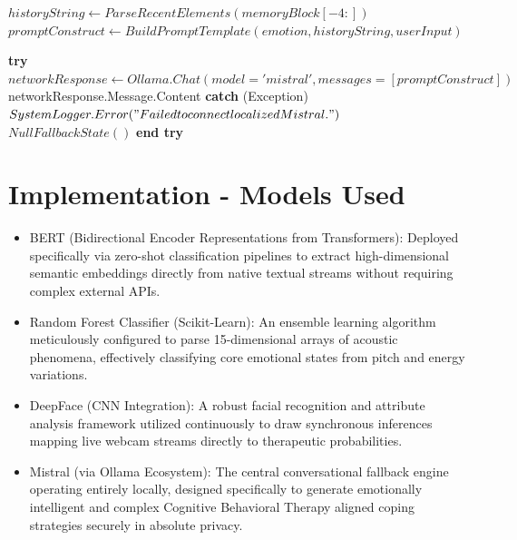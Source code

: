 \documentclass[11pt]{report}
\newcommand{\Try}{\State \textbf{try}}
\newcommand{\Catch}[1]{\State \textbf{catch} (#1)}
\newcommand{\EndTry}{\State \textbf{end try}}
\begin{document}
\begin{algorithm}[H]
\caption{Generate Complex Fallback Vectors Via Local LLM Contexts}
\label{alg:cbt_mistral}
\begin{algorithmic}[1]
    \State $historyString \gets ParseRecentElements(memoryBlock[-4:])$
    \State $promptConstruct \gets BuildPromptTemplate(emotion, historyString, userInput)$
    
    \Try
        \State $networkResponse \gets Ollama.Chat(model='mistral', messages=[promptConstruct])$
        \State \Return networkResponse.Message.Content
    \Catch{Exception}
        \State $SystemLogger.Error("Failed to connect localized Mistral.")$
        \State \Return $NullFallbackState()$
    \EndTry
\EndProcedure
\end{algorithmic}
\end{algorithm}


\section{Implementation - Models Used}
\begin{itemize}
    \item BERT (Bidirectional Encoder Representations from Transformers): Deployed specifically via zero-shot classification pipelines to extract high-dimensional semantic embeddings directly from native textual streams without requiring complex external APIs.
    \item Random Forest Classifier (Scikit-Learn): An ensemble learning algorithm meticulously configured to parse 15-dimensional arrays of acoustic phenomena, effectively classifying core emotional states from pitch and energy variations.
    \item DeepFace (CNN Integration): A robust facial recognition and attribute analysis framework utilized continuously to draw synchronous inferences mapping live webcam streams directly to therapeutic probabilities.
    \item Mistral (via Ollama Ecosystem): The central conversational fallback engine operating entirely locally, designed specifically to generate emotionally intelligent and complex Cognitive Behavioral Therapy aligned coping strategies securely in absolute privacy.
\end{itemize}
\end{document}
